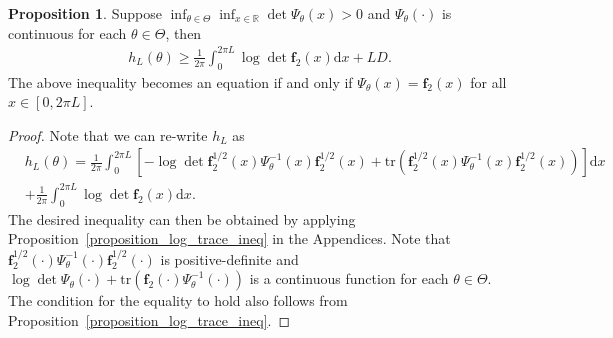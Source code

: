 \documentclass[11pt]{article}
\numberwithin{equation}{section}
\theoremstyle{plain}
\theoremstyle{definition}
\theoremstyle{definition}
\theoremstyle{assumption}
\theoremstyle{proposition}
\newtheorem{proposition}{Proposition}[section]
\theoremstyle{proposition}
\theoremstyle{example}
\theoremstyle{lemma}
\theoremstyle{theorem}
\theoremstyle{remark}
\begin{document}
\begin{proposition}\label{prop_freq_KL_min}
Suppose $\inf_{\theta\in\Theta}\inf_{x\in\mathbb{R}}\det\Psi_{\theta}(x)>0$ and $\Psi_{\theta}(\cdot)$ is continuous for each $\theta\in\Theta$, then
\begin{align*}
    h_L(\theta) \geqslant \frac{1}{2\pi}\int_0^{2\pi L}\log\det\boldsymbol{f}_2(x)\mathrm{d}x + LD .
\end{align*} 
The above inequality becomes an equation if and only if $\Psi_{\theta}(x) = \boldsymbol{f}_2(x)$ for all $x\in[0,2\pi L]$.
\begin{proof}
Note that we can re-write $h_L$ as
\begin{align*}
&h_L(\theta)= \frac{1}{2\pi}\int_0^{2\pi L}\left[-\log\det\boldsymbol{f}_2^{1/2}(x)\Psi_{\theta}^{-1}(x)\boldsymbol{f}_2^{1/2}(x) 
+ \mathrm{tr}(\boldsymbol{f}_2^{1/2}(x)\Psi_{\theta}^{-1}(x)\boldsymbol{f}_2^{1/2}(x))  \right]\mathrm{d}x \\
&+ \frac{1}{2\pi}\int_0^{2\pi L}\log\det\boldsymbol{f}_2(x)\mathrm{d}x .
\end{align*} 
The desired inequality can then be obtained by applying Proposition~\ref{proposition_log_trace_ineq} in the Appendices. Note that $\boldsymbol{f}_2^{1/2}(\cdot)\Psi_{\theta}^{-1}(\cdot)\boldsymbol{f}_2^{1/2}(\cdot)$ is positive-definite and $\log\det\Psi_{\theta}(\cdot) + \mathrm{tr}(\boldsymbol{f}_2(\cdot)\Psi_{\theta}^{-1}(\cdot))$ is a continuous function for each $\theta\in\Theta$. The condition for the equality to hold also follows from Proposition~\ref{proposition_log_trace_ineq}.
\end{proof}
\end{proposition}
\end{document}
